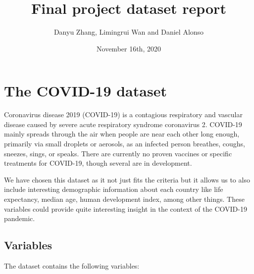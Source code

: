 \documentclass[]{article}
\title{Final project dataset report}
\author{Danyu Zhang, Limingrui Wan and Daniel Alonso}
\date{November 16th, 2020}
\begin{document}
\maketitle

\hypertarget{the-covid-19-dataset}{%
\section{The COVID-19 dataset}\label{the-covid-19-dataset}}

Coronavirus disease 2019 (COVID-19) is a contagious respiratory and
vascular disease caused by severe acute respiratory syndrome coronavirus
2. COVID-19 mainly spreads through the air when people are near each
other long enough, primarily via small droplets or aerosols, as an
infected person breathes, coughs, sneezes, sings, or speaks. There are
currently no proven vaccines or specific treatments for COVID-19, though
several are in development.

We have chosen this dataset as it not just fits the criteria but it
allows us to also include interesting demographic information about each
country like life expectancy, median age, human development index, among
other things. These variables could provide quite interesting insight in
the context of the COVID-19 pandemic.

\hypertarget{variables}{%
\subsection{Variables}\label{variables}}

The dataset contains the following variables:
\end{document}
